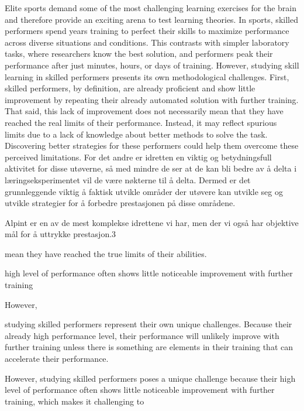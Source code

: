 Elite sports demand some of the most challenging learning exercises for the brain and therefore provide an exciting arena to test learning theories. In sports, skilled performers spend years training to perfect their skills to maximize performance across diverse situations and conditions. This contrasts with simpler laboratory tasks, where researchers know the best solution, and performers peak their performance after just minutes, hours, or days of training. However, studying skill learning in skilled performers presents its own methodological challenges. First, skilled performers, by definition, are already proficient and show little improvement by repeating their already automated solution with further training. That said, this lack of improvement does not necessarily mean that they have reached the real limits of their performance. Instead, it may reflect spurious limits due to a lack of knowledge about better methods to solve the task. Discovering better strategies for these performers could help them overcome these perceived limitations. For det andre er idretten en viktig og betydningsfull aktivitet for disse utøverne, så med mindre de ser at de kan bli bedre av å delta i læringseksperimentet vil de være nøkterne til å delta. Dermed er det grunnleggende viktig å faktisk utvikle områder der utøvere kan utvikle seg og utvikle strategier for å forbedre prestasjonen på disse områdene. 

Alpint er en av de mest komplekse idrettene vi har, men der vi også har objektive mål for å uttrykke prestasjon.3






mean they have reached the true limits of their abilities. 


high level of performance often shows little noticeable improvement with further training




However, 




studying skilled performers represent their own unique challenges. Because their already high performance level, their performance will unlikely improve with further training unless there is something are elements in their training that can accelerate their performance.

However, studying skilled performers poses a unique challenge because their high level of performance often shows little noticeable improvement with further training, which makes it challenging to 


